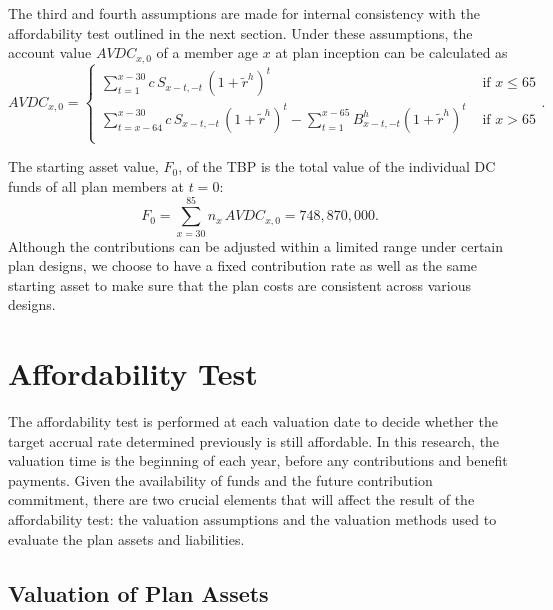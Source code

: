 \documentclass{sfuthesis}
\numberwithin{equation}{chapter}
\begin{document}
		\justify
		The third and fourth assumptions are made for internal consistency with the affordability test outlined in the next section. Under these assumptions, the account value $AVDC_{x,0}$ of a member age $x$ at plan inception can be calculated as
		\begin{equation}
		\label{eq:STBP_14}
		AVDC_{x,0} = 
		\left\{
		\begin{array}{ll}
		\sum\limits_{t=1}^{x-30}c\,S_{x-t,-t}\,(1+\tilde{r}^{h})^t &\text{ if } x\leqslant 65\\
		\sum\limits_{t=x-64}^{x-30}c\,S_{x-t,-t}\,(1+\tilde{r}^{h})^t - \sum\limits_{t=1}^{x-65} B^{h}_{x-t,-t}(1+\tilde{r}^{h})^t &\text{ if } x>65\\
		\end{array}
		\right..
		\end{equation}


	
		\justify
		The starting asset value, $F_{0}$, of the TBP is the total value of the individual DC funds of all plan members at $t=0$:
		\begin{equation}
		\label{eq:STBP_15}
		F_{0} = \sum_{x=30}^{85} n_{x}\, AVDC_{x,0} = 748,870,000.
		\end{equation}
		Although the contributions can be adjusted within a limited range under certain plan designs, we choose to have a fixed contribution rate as well as the same starting asset to make sure that the plan costs are consistent across various designs.
	
	
	\section{Affordability Test}
	\label{Affordability Test}
	
		\justify
		The affordability test is performed at each valuation date to decide whether the target accrual rate determined previously is still affordable. In this research, the valuation time is the beginning of each year, before any contributions and benefit payments. Given the availability of funds and the future contribution commitment, there are two crucial elements that will affect the result of the affordability test: the valuation assumptions and the valuation methods used to evaluate the plan assets and liabilities.
	
	
	
	\subsection{Valuation of Plan Assets}
	\label{Valuation of Plan Assets}
	
\end{document}
